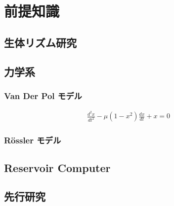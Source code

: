 \chapter{前提知識}

\section{生体リズム研究}
\section{力学系}
\subsection{Van Der Pol モデル}

\begin{align}
    \frac{d^2 x}{d t^2}-\mu\left(1-x^2\right) \frac{d x}{d t}+x=0
\end{align}

\subsection{Rössler モデル}
\section{Reservoir Computer}
\section{先行研究}

\clearpage
